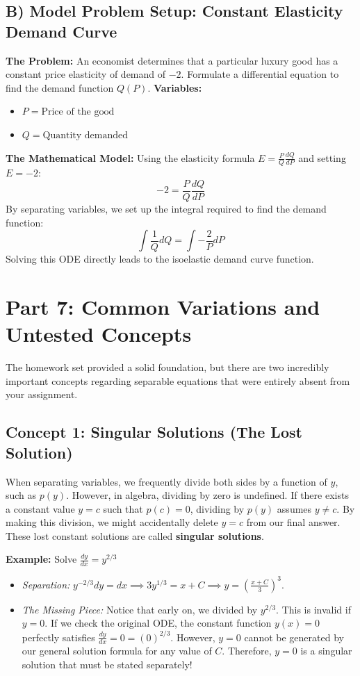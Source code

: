 \documentclass[11pt]{article}
\begin{document}
\subsection{B) Model Problem Setup: Constant Elasticity Demand Curve}
\textbf{The Problem:} An economist determines that a particular luxury good has a constant price elasticity of demand of $-2$. Formulate a differential equation to find the demand function $Q(P)$. 
\newline
\textbf{Variables:}
\begin{itemize}
    \item $P = \text{Price of the good}$
    \item $Q = \text{Quantity demanded}$
\end{itemize}
\textbf{The Mathematical Model:}
Using the elasticity formula $E = \frac{P}{Q}\frac{dQ}{dP}$ and setting $E = -2$:
\[ -2 = \frac{P}{Q} \frac{dQ}{dP} \]
By separating variables, we set up the integral required to find the demand function:
\[ \int \frac{1}{Q} dQ = \int -\frac{2}{P} dP \]
Solving this ODE directly leads to the isoelastic demand curve function.

\newpage
\section{Part 7: Common Variations and Untested Concepts}

The homework set provided a solid foundation, but there are two incredibly important concepts regarding separable equations that were entirely absent from your assignment.

\subsection{Concept 1: Singular Solutions (The Lost Solution)}
When separating variables, we frequently divide both sides by a function of $y$, such as $p(y)$. However, in algebra, dividing by zero is undefined. If there exists a constant value $y = c$ such that $p(c) = 0$, dividing by $p(y)$ assumes $y \neq c$. By making this division, we might accidentally delete $y = c$ from our final answer. These lost constant solutions are called \textbf{singular solutions}.

\textbf{Example:} Solve $\frac{dy}{dx} = y^{2/3}$
\begin{itemize}
    \item \textit{Separation:} $y^{-2/3}dy = dx \implies 3y^{1/3} = x + C \implies y = \left( \frac{x+C}{3} \right)^3$.
    \item \textit{The Missing Piece:} Notice that early on, we divided by $y^{2/3}$. This is invalid if $y = 0$. If we check the original ODE, the constant function $y(x) = 0$ perfectly satisfies $\frac{dy}{dx} = 0 = (0)^{2/3}$. However, $y=0$ cannot be generated by our general solution formula for any value of $C$. Therefore, $y=0$ is a singular solution that must be stated separately!
\end{itemize}
\end{document}
